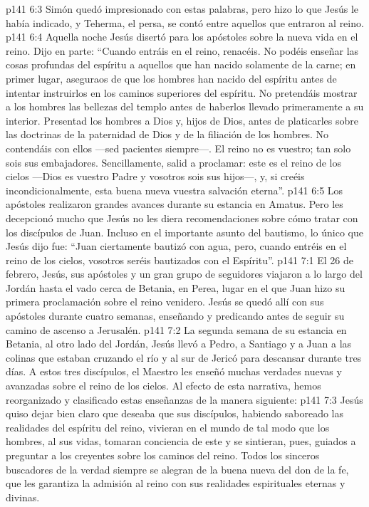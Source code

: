 \vs p141 6:3 Simón quedó impresionado con estas palabras, pero hizo lo que Jesús le había indicado, y Teherma, el persa, se contó entre aquellos que entraron al reino.
\vs p141 6:4 \pc Aquella noche Jesús disertó para los apóstoles sobre la nueva vida en el reino. Dijo en parte: “Cuando entráis en el reino, renacéis. No podéis enseñar las cosas profundas del espíritu a aquellos que han nacido solamente de la carne; en primer lugar, aseguraos de que los hombres han nacido del espíritu antes de intentar instruirlos en los caminos superiores del espíritu. No pretendáis mostrar a los hombres las bellezas del templo antes de haberlos llevado primeramente a su interior. Presentad los hombres a Dios y,  hijos de Dios, antes de platicarles sobre las doctrinas de la paternidad de Dios y de la filiación de los hombres. No contendáis con ellos ---sed pacientes siempre---. El reino no es vuestro; tan solo sois sus embajadores. Sencillamente, salid a proclamar: este es el reino de los cielos ---Dios es vuestro Padre y vosotros sois sus hijos---, y, si creéis incondicionalmente, esta buena nueva  vuestra salvación eterna”.
\vs p141 6:5 Los apóstoles realizaron grandes avances durante su estancia en Amatus. Pero les decepcionó mucho que Jesús no les diera recomendaciones sobre cómo tratar con los discípulos de Juan. Incluso en el importante asunto del bautismo, lo único que Jesús dijo fue: “Juan ciertamente bautizó con agua, pero, cuando entréis en el reino de los cielos, vosotros seréis bautizados con el Espíritu”.
\vs p141 7:1 El 26 de febrero, Jesús, sus apóstoles y un gran grupo de seguidores viajaron a lo largo del Jordán hasta el vado cerca de Betania, en Perea, lugar en el que Juan hizo su primera proclamación sobre el reino venidero. Jesús se quedó allí con sus apóstoles durante cuatro semanas, enseñando y predicando antes de seguir su camino de ascenso a Jerusalén.
\vs p141 7:2 La segunda semana de su estancia en Betania, al otro lado del Jordán, Jesús llevó a Pedro, a Santiago y a Juan a las colinas que estaban cruzando el río y al sur de Jericó para descansar durante tres días. A estos tres discípulos, el Maestro les enseñó muchas verdades nuevas y avanzadas sobre el reino de los cielos. Al efecto de esta narrativa, hemos reorganizado y clasificado estas enseñanzas de la manera siguiente:
\vs p141 7:3 \pc Jesús quiso dejar bien claro que deseaba que sus discípulos, habiendo saboreado las realidades del espíritu del reino, vivieran en el mundo de tal modo que los hombres, al  sus vidas, tomaran conciencia de este y se sintieran, pues, guiados a preguntar a los creyentes sobre los caminos del reino. Todos los sinceros buscadores de la verdad siempre se alegran de  la buena nueva del don de la fe, que les garantiza la admisión al reino con sus realidades espirituales eternas y divinas.

